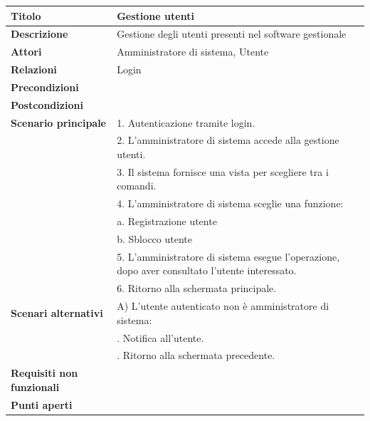 \documentclass[a4paper]{article}
\begin{document}


  \begin{center}
    \begin{tabularx}{1\textwidth}{l|X}
        \textbf{Titolo} & Gestione utenti \\
        \hline
        \textbf{Descrizione} & Gestione degli utenti presenti nel software gestionale \\
        \hline
        \textbf{Attori} & Amministratore di sistema, Utente \\
        \hline
        \textbf{Relazioni} & Login \\
        \hline
        \textbf{Precondizioni} &  \\
        \hline
        \textbf{Postcondizioni} &  \\
        \hline
        \textbf{Scenario principale} & 1. Autenticazione tramite login. \\
                                     & 2. L'amministratore di sistema accede alla gestione utenti. \\
                                     & 3. Il sistema fornisce una vista per scegliere tra i comandi. \\
                                     & 4. L'amministratore di sistema sceglie una funzione: \\
                                     & \quad a. Registrazione utente \\
                                     & \quad b. Sblocco utente \\
                                     & 5. L'amministratore di sistema esegue l'operazione, dopo aver consultato l'utente interessato.\\
                                     & 6. Ritorno alla schermata principale.\\
        \hline
        \textbf{Scenari alternativi} & A) L'utente autenticato non è amministratore di sistema: \\
                                     & \quad 1. Notifica all'utente.\\
                                     & \quad 2. Ritorno alla schermata precedente.\\
        \hline
        \textbf{Requisiti non funzionali} & \\
        \hline
        \textbf{Punti aperti} & \\
        \hline
    \end{tabularx}
  \end{center}
\end{document}
